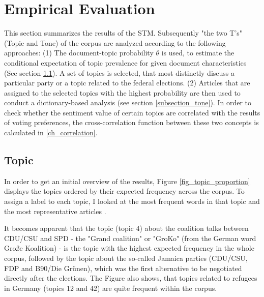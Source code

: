 \documentclass[12pt,a4paper,notitlepage]{article}
\begin{document}
\section{Empirical Evaluation}\label{ch_empirical}

This section summarizes the results of the STM. Subsequently "the two T's" (Topic and Tone) of the corpus are analyzed according to the following approaches: (1) The document-topic probability $\theta$ is used, to estimate the conditional expectation of topic prevalence for given document characteristics (See section \ref{subsection_topic}). A set of topics is selected, that most distinctly discuss a particular party or a topic related to the federal elections. (2) Articles that are assigned to the selected topics with the highest probability are then used to conduct a dictionary-based analysis (see section \ref{subsection_tone}). In order to check whether the sentiment value of certain topics are correlated with the results of voting preferences, the cross-correlation function between these two concepts is calculated in \ref{ch_correlation}.

\subsection{Topic}\label{subsection_topic}

In order to get an initial overview of the results, Figure \ref{fig_topic_proportion} displays the topics ordered by their expected frequency across the corpus. To assign a label to each topic, I looked at the most frequent words in that topic and the most representative articles \citep{roberts_model_2016}. 

It becomes apparent that the topic (topic 4) about the coalition talks between CDU/CSU and SPD - the "Grand coalition" or "GroKo" (from the German word Große Koalition) - is the topic with the highest expected frequency in the whole corpus, followed by the topic about the so-called Jamaica parties (CDU/CSU, FDP and B90/Die Grünen), which was the first alternative to be negotiated directly after the elections. The Figure also shows, that topics related to refugees in Germany (topics 12 and 42) are quite frequent within the corpus. 
\end{document}
